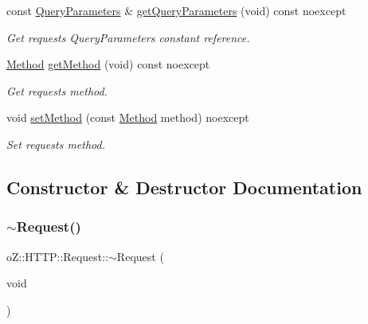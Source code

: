 \begin{DoxyCompactItemize}
const \mbox{\hyperlink{namespaceo_z_1_1_h_t_t_p_adf31e2c29997ec6637f36d62ab8944d6}{Query\+Parameters}} \& \mbox{\hyperlink{classo_z_1_1_h_t_t_p_1_1_request_a0b3375eaf3e24509f63776847ce6b784}{get\+Query\+Parameters}} (void) const noexcept
\begin{DoxyCompactList}\small\item\em Get request\textquotesingle{}s Query\+Parameters constant reference. \end{DoxyCompactList}\item 
\mbox{\hyperlink{namespaceo_z_1_1_h_t_t_p_a02d8497e4abbb0adf3af0fe9fad1b7a6}{Method}} \mbox{\hyperlink{classo_z_1_1_h_t_t_p_1_1_request_ab8c06f60e7d3b17c2ad03c7b9cb046d7}{get\+Method}} (void) const noexcept
\begin{DoxyCompactList}\small\item\em Get request\textquotesingle{}s method. \end{DoxyCompactList}\item 
void \mbox{\hyperlink{classo_z_1_1_h_t_t_p_1_1_request_ad38f30d48f4d3f201380ac1e73b26fc8}{set\+Method}} (const \mbox{\hyperlink{namespaceo_z_1_1_h_t_t_p_a02d8497e4abbb0adf3af0fe9fad1b7a6}{Method}} method) noexcept
\begin{DoxyCompactList}\small\item\em Set request\textquotesingle{}s method. \end{DoxyCompactList}\end{DoxyCompactItemize}


\subsection{Constructor \& Destructor Documentation}
\mbox{\label{classo_z_1_1_h_t_t_p_1_1_request_a2bc2913d79ffe8ce63a19c480b9cf330}} 
\subsubsection{\texorpdfstring{$\sim$Request()}{~Request()}}
{\footnotesize\ttfamily o\+Z\+::\+H\+T\+T\+P\+::\+Request\+::$\sim$\+Request (\begin{DoxyParamCaption}\item[{void}]{ }\end{DoxyParamCaption})\hspace{0.3cm}{\ttfamily [default]}}



